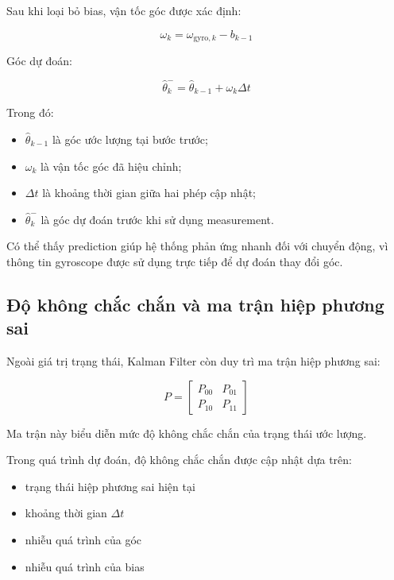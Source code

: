 \documentclass[a4paper,12pt]{report}
\begin{document}
Sau khi loại bỏ bias, vận tốc góc được xác định:

\begin{equation}
\omega_k
=
\omega_{\text{gyro},k}
-
b_{k-1}
\end{equation}

Góc dự đoán:

\begin{equation}
\hat{\theta}_k^{-}
=
\hat{\theta}_{k-1}
+
\omega_k\Delta t
\end{equation}

Trong đó:

\begin{itemize}
    \item $\hat{\theta}_{k-1}$ là góc ước lượng tại bước trước;
    \item $\omega_k$ là vận tốc góc đã hiệu chỉnh;
    \item $\Delta t$ là khoảng thời gian giữa hai phép cập nhật;
    \item $\hat{\theta}_k^{-}$ là góc dự đoán trước khi sử dụng measurement.
\end{itemize}

Có thể thấy prediction giúp hệ thống phản ứng nhanh đối với chuyển động, vì thông tin gyroscope được sử dụng trực tiếp để dự đoán thay đổi góc.


\subsection{Độ không chắc chắn và ma trận hiệp phương sai}

Ngoài giá trị trạng thái, Kalman Filter còn duy trì ma trận hiệp phương sai:

\begin{equation}
P=
\begin{bmatrix}
P_{00} & P_{01}\\
P_{10} & P_{11}
\end{bmatrix}
\end{equation}

Ma trận này biểu diễn mức độ không chắc chắn của trạng thái ước lượng.

Trong quá trình dự đoán, độ không chắc chắn được cập nhật dựa trên:

\begin{itemize}
    \item trạng thái hiệp phương sai hiện tại
    \item khoảng thời gian $\Delta t$
    \item nhiễu quá trình của góc
    \item nhiễu quá trình của bias
\end{itemize}
\end{document}
